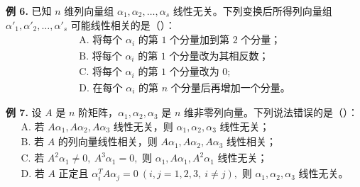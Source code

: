 \begin{problemblock}
\textbf{例 6.} 已知 \(n\) 维列向量组 \(\alpha_1,\alpha_2,\ldots,\alpha_s\) 线性无关。下列变换后所得列向量组 \(\alpha'_1,\alpha'_2,\ldots,\alpha'_s\) 可能线性相关的是（\quad）：
\[
\begin{array}{l}
\text{A. 将每个 }\alpha_i\text{ 的第 1 个分量加到第 2 个分量；}\\
\text{B. 将每个 }\alpha_i\text{ 的第 1 个分量改为其相反数；}\\
\text{C. 将每个 }\alpha_i\text{ 的第 1 个分量改为 }0;\\
\text{D. 在每个 }\alpha_i\text{ 的第 }n\text{ 个分量后再增加一个分量。}
\end{array}
\]
\end{problemblock}
\begin{solutionblock}
\end{solutionblock}

\begin{problemblock}
\textbf{例 7.} 设 \(A\) 是 \(n\) 阶矩阵，\(\alpha_1,\alpha_2,\alpha_3\) 是 \(n\) 维非零列向量。下列说法错误的是（\quad）：
\[
\begin{array}{l}
\text{A. 若 }A\alpha_1,A\alpha_2,A\alpha_3\text{ 线性无关，则 }\alpha_1,\alpha_2,\alpha_3\text{ 线性无关；}\\
\text{B. 若 }A\text{ 的列向量线性相关，则 }A\alpha_1,A\alpha_2,A\alpha_3\text{ 线性相关；}\\
\text{C. 若 }A^2\alpha_1\ne0,\ A^3\alpha_1=0,\text{ 则 }\alpha_1,A\alpha_1,A^2\alpha_1\text{ 线性无关；}\\
\text{D. 若 }A\text{ 正定且 }\alpha_i^TA\alpha_j=0\ (i,j=1,2,3,\ i\ne j),\text{ 则 }\alpha_1,\alpha_2,\alpha_3\text{ 线性无关。}
\end{array}
\]
\end{problemblock}
\begin{solutionblock}
\end{solutionblock}

